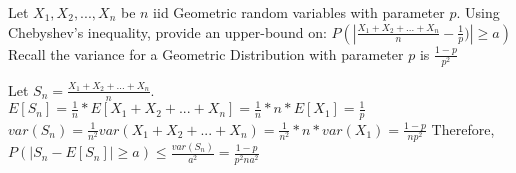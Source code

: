 \question Let $X_1, X_2, ... , X_n$ be $n$ iid Geometric random variables with parameter $p$. Using Chebyshev's inequality, provide an upper-bound on: $P(|\frac{X_1 + X_2 + ... + X_n}{n} - \frac{1}{p})| \geq a)$ \newline
Recall the variance for a Geometric Distribution with parameter $p$ is $\frac{1-p}{p^2}$
\begin{solution}[2cm]
	Let $S_n = \frac{X_1 + X_2 + ... + X_n}{n}$. \newline
	$E[S_n] = \frac{1}{n} * E[X_1 + X_2 + ... + X_n] = \frac{1}{n} * n * E[X_1] = \frac{1}{p}$ \newline
	$var(S_n) = \frac{1}{n^2}var(X_1 + X_2 + ... + X_n) = \frac{1}{n^2} * n * var(X_1) = \frac{1-p}{np^2}$ \newline
	Therefore, $P(|S_n - E[S_n]| \geq a) \leq \frac{var(S_n)}{a^2} = \frac{1-p}{p^2na^2}$
\end{solution}